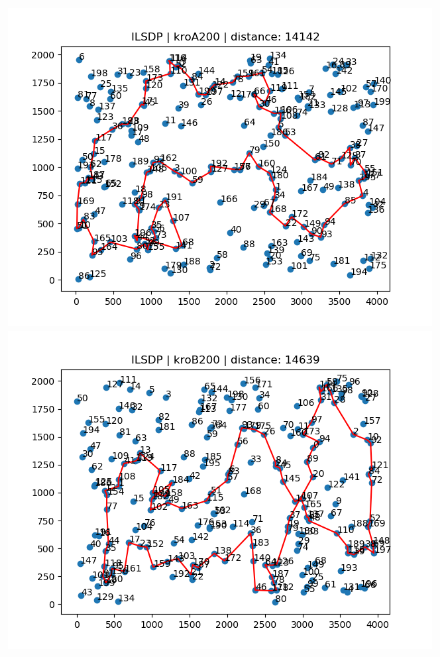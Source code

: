 \documentclass{article}
\begin{document}
\begin{figure}[h!]
    \centering
  \begin{minipage}[b]{0.8\textwidth}
    \includegraphics[width=\textwidth]{ilsdp_kroA200.png}
  \end{minipage}

  \begin{minipage}[b]{0.8\textwidth}
    \includegraphics[width=\textwidth]{ilsdp_kroB200.png}
  \end{minipage}
\end{figure}
\end{document}
